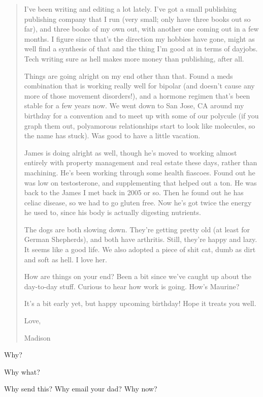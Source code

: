 \begin{quotation}
  I've been writing and editing a lot lately. I've got a small publishing publishing company that I run (very small; only have three books out so far), and three books of my own out, with another one coming out in a few months. I figure since that's the direction my hobbies have gone, might as well find a synthesis of that and the thing I'm good at in terms of dayjobs. Tech writing sure as hell makes more money than publishing, after all.

  Things are going alright on my end other than that. Found a meds combination that is working really well for bipolar (and doesn't cause any more of those movement disorders!), and a hormone regimen that's been stable for a few years now. We went down to San Jose, CA around my birthday for a convention and to meet up with some of our polycule (if you graph them out, polyamorous relationships start to look like molecules, so the name has stuck). Was good to have a little vacation.

  James is doing alright as well, though he's moved to working almost entirely with property management and real estate these days, rather than machining. He's been working through some health fiascoes. Found out he was low on testosterone, and supplementing that helped out a ton. He was back to the James I met back in 2005 or so. Then he found out he has celiac disease, so we had to go gluten free. Now he's got twice the energy he used to, since his body is actually digesting nutrients.

  The dogs are both slowing down. They're getting pretty old (at least for German Shepherds), and both have arthritis. Still, they're happy and lazy. It seems like a good life. We also adopted a piece of shit cat, dumb as dirt and soft as hell. I love her.

  How are things on your end? Been a bit since we've caught up about the day-to-day stuff. Curious to hear how work is going. How's Maurine?

  It's a bit early yet, but happy upcoming birthday! Hope it treats you well.

  Love,

  Madison
\end{quotation}

\newpage

\begin{ally}
  Why?
\end{ally}

Why what?

\begin{ally}
  Why send this? Why email your dad? Why now?
\end{ally}

